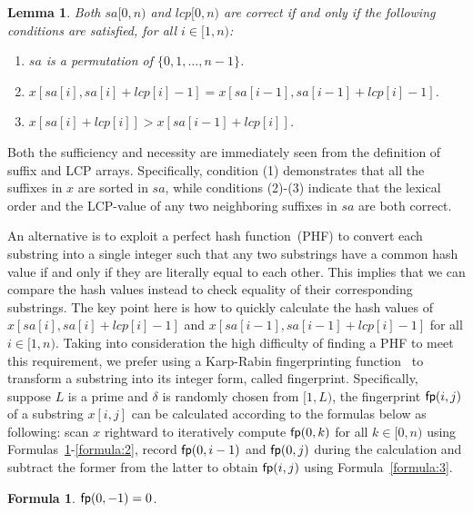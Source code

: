 \documentclass[10pt,journal,compsoc]{IEEEtran}
\newtheorem{Formula}{Formula}
\newtheorem{Lemma}{Lemma}
\begin{document}
\begin{Lemma} \label{lemma:1}
	Both $sa[0, n)$ and $lcp[0, n)$ are correct if and only if the following conditions are satisfied, for all $i \in [1, n)$:
	\begin{enumerate}[(1)]
		\item
		$sa$ is a permutation of $\{0, 1, \dots, n - 1\}$.
		\item
		$x[sa[i], sa[i] + lcp[i] - 1] = x[sa[i - 1], sa[i - 1] + lcp[i] - 1]$.
		\item
		$x[sa[i] + lcp[i]] > x[sa[i - 1] + lcp[i]]$. 	
	\end{enumerate}
\end{Lemma}

\begin{IEEEproof}
	Both the sufficiency and necessity are immediately seen from the definition of suffix and LCP arrays. Specifically, condition (1) demonstrates that all the suffixes in $x$ are sorted in $sa$, while conditions (2)-(3) indicate that the lexical order and the LCP-value of any two neighboring suffixes in $sa$ are both correct.
\end{IEEEproof}

An alternative is to exploit a perfect hash function~(PHF) to convert each substring into a single integer such that any two substrings have a common hash value if and only if they are literally equal to each other. This implies that we can compare the hash values instead to check equality of their corresponding substrings. The key point here is how to quickly calculate the hash values of $x[sa[i], sa[i] + lcp[i] - 1]$ and $x[sa[i - 1], sa[i - 1] + lcp[i] - 1]$ for all $i \in [1, n)$. Taking into consideration the high difficulty of finding a PHF to meet this requirement, we prefer using a Karp-Rabin fingerprinting function~\cite{Karp1987} to transform a substring into its integer form, called fingerprint. Specifically, suppose $L$ is a prime and $\delta$ is randomly chosen from $[1, L)$, the fingerprint ${\sf fp}(i, j)$ of a substring $x[i, j]$ can be calculated according to the formulas below as following: scan $x$ rightward to iteratively compute ${\sf fp}(0, k)$ for all $k \in [0, n)$ using Formulas~\ref{formula:1}-\ref{formula:2}, record ${\sf fp}(0, i - 1)$ and ${\sf fp}(0, j)$ during the calculation and subtract the former from the latter to obtain ${\sf fp}(i, j)$ using Formula~\ref{formula:3}.

\begin{Formula} \label{formula:1}
	${\sf fp}(0, -1) = 0$.
	
\end{Formula}
\end{document}
